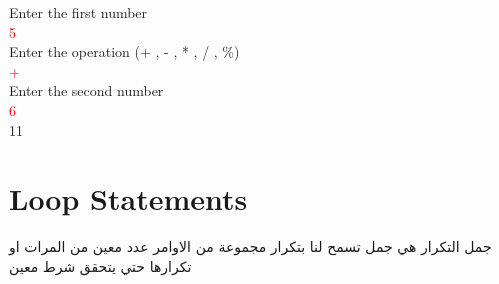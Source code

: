 Enter the first number\\
\textcolor{red}{5}\\
Enter the operation (+ , - , * , / , \%)\\
\textcolor{red}{+}\\
Enter the second number\\
\textcolor{red}{6}\\
11

\begin{task}

  
\end{task}
\newpage
\section{Loop Statements}
\begin{AR}
  جمل التكرار هي جمل تسمح لنا بتكرار مجموعة من الاوامر 
  عدد معين من المرات او تكرارها حتي يتحقق شرط معين 
\end{AR}

